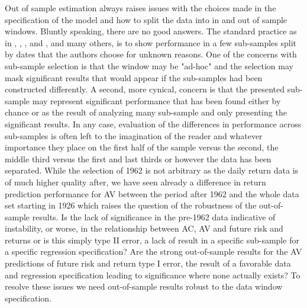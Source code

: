 Out of sample estimation always raises issues with the choices made in the specification of the model and how to split the data into in and out of sample windows. 
Bluntly speaking, there are no good answers. The standard practice as in \citet{Rapach2013}, \citet{Rapach2010}, \citet{Rapach2016}, and \cite{Huang2015}, and many others, is to show performance in a few sub-samples split by dates that the authors choose for unknown reasons. One of the concerns with sub-sample selection is that the window may be "ad-hoc" and the selection may mask significant results that would appear if the sub-samples had been constructed differently. A second, more cynical, concern is that the presented sub-sample may represent significant performance that has been found either by chance or as the result of analyzing many sub-sample and only presenting the significant results. In any case, evaluation of the differences in performance across sub-samples is often left to the imagination of the reader and whatever importance they place on the first half of the sample versus the second, the middle third versus the first and last thirds or however the data has been separated. While the selection of 1962 is not arbitrary as the daily return data is of much higher quality after, we have seen already a difference in return prediction performance for AV between the period after 1962 and the whole data set starting in 1926 which raises the question of the robustness of the out-of-sample results. Is the lack of significance in the pre-1962 data indicative of instability, or worse, in the relationship between AC, AV and future risk and returns or is this simply type II error, a lack of result in a specific sub-sample for a specific regression specification? Are the strong out-of-sample results for the AV predictions of future risk and return type I error, the result of a favorable data and regression specification leading to significance where none actually exists? To resolve these issues we need out-of-sample results robust to the data window specification. 

